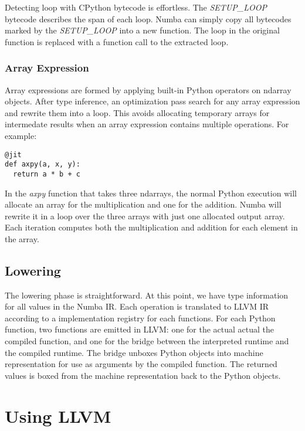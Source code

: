\documentclass{acm_proc_article-sp}
\begin{document}
Detecting loop with CPython bytecode is effortless. The \textit{SETUP\_LOOP}
bytecode describes the span of each loop. Numba can simply copy all
bytecodes marked by the \textit{SETUP\_LOOP} into a new function. The loop in
the original function is replaced with a function call to the extracted loop.

\subsubsection{Array Expression}

Array expressions are formed by applying built-in Python operators on
ndarray objects. After type inference, an optimization pass search for any
array expression and rewrite them into a loop. This avoids allocating
temporary arrays for intermedate results when an array expression contains
multiple operations.  For example:

\begin{lstlisting}
@jit
def axpy(a, x, y):
  return a * b + c
\end{lstlisting}

In the \textit{axpy} function that takes three ndarrays, the normal Python
execution will allocate an array for the multiplication and one for the
addition. Numba will rewrite it in a loop over the three arrays with just
one allocated output array.  Each iteration computes both the multiplication
and addition for each element in the array.

\subsection{Lowering}

The lowering phase is straightforward.  At this point, we have type information
for all values in the Numba IR. Each operation is translated to LLVM IR
according to a implementation registry for each functions.  For each Python
function, two functions are emitted in LLVM: one for the actual
actual the compiled function, and one for the bridge between the interpreted
runtime and the compiled runtime. The bridge unboxes Python objects into
machine representation for use as arguments by the compiled function.  The
returned values is boxed from the machine representation back to the Python
objects.


\section{Using LLVM}
\end{document}

